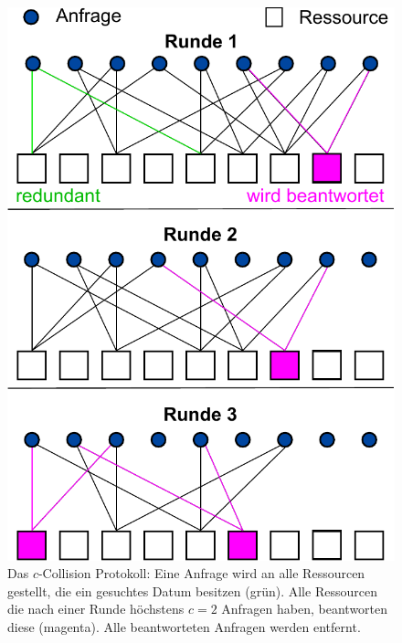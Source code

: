 \begin{figure}
  \centering
  \includegraphics[scale=0.55]{images/ccollision2.pdf}
  \caption{\label{fig:relwork:ccollision} Das $c$-Collision Protokoll: Eine Anfrage wird an alle Ressourcen gestellt, die ein gesuchtes Datum besitzen (grün). Alle Ressourcen die nach einer Runde höchstens $c=2$ Anfragen haben, beantworten diese (magenta). Alle beantworteten Anfragen werden entfernt.}\phantom{\;\;\;\;\;\;\;\;\;\;\;\;\;\;\;\;\;\;\;\;\;\;}
\end{figure}

